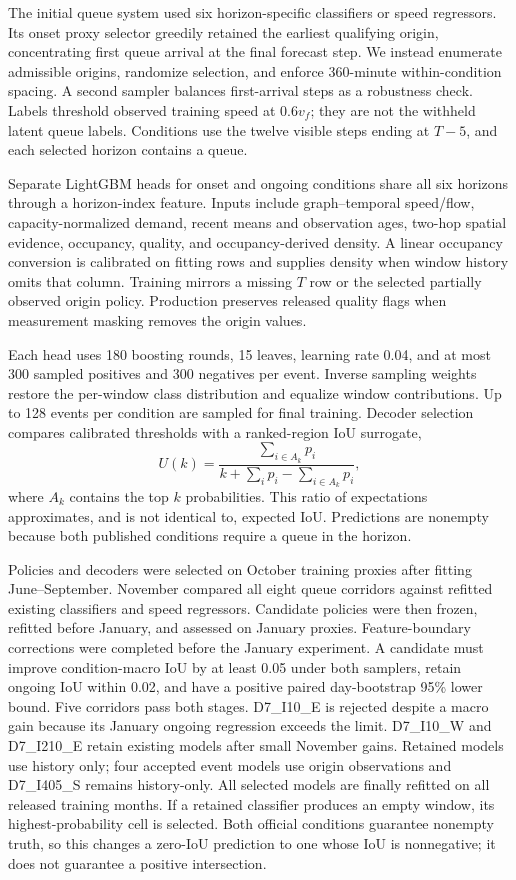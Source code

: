 \documentclass[conference]{IEEEtran}
\begin{document}
The initial queue system used six horizon-specific classifiers or speed
regressors. Its onset proxy selector greedily retained the earliest qualifying
origin, concentrating first queue arrival at the final forecast step. We instead
enumerate admissible origins, randomize selection, and enforce 360-minute
within-condition spacing. A second sampler balances first-arrival steps as a
robustness check. Labels threshold observed training speed at $0.6v_f$;
they are not the withheld latent queue labels. Conditions use the twelve
visible steps ending at $T-5$, and each selected horizon contains a queue.

Separate LightGBM heads for onset and ongoing conditions share all six horizons
through a horizon-index feature. Inputs include graph--temporal speed/flow,
capacity-normalized demand, recent means and observation ages, two-hop spatial
evidence, occupancy, quality, and occupancy-derived density. A linear
occupancy conversion is calibrated on fitting rows and supplies density when
window history omits that column. Training mirrors a missing $T$ row or the
selected partially observed origin policy. Production preserves released quality
flags when measurement masking removes the origin values.

Each head uses 180 boosting rounds, 15 leaves, learning rate 0.04, and at most
300 sampled positives and 300 negatives per event. Inverse sampling weights
restore the per-window class distribution and equalize window contributions.
Up to 128 events per condition are sampled for final training. Decoder selection
compares calibrated thresholds with a ranked-region IoU surrogate,
\begin{equation}
 U(k)=\frac{\sum_{i\in A_k}p_i}{k+\sum_i p_i-\sum_{i\in A_k}p_i},
\end{equation}
where $A_k$ contains the top $k$ probabilities. This ratio of expectations
approximates, and is not identical to, expected IoU. Predictions are nonempty
because both published conditions require a queue in the horizon.

Policies and decoders were selected on October training proxies after fitting
June--September. November compared all eight queue corridors against refitted
existing classifiers and speed regressors. Candidate policies were then frozen,
refitted before January, and assessed on January proxies. Feature-boundary
corrections were completed before the January experiment. A candidate must
improve condition-macro IoU by at least 0.05 under both samplers, retain ongoing
IoU within 0.02, and have a positive paired day-bootstrap 95\% lower bound.
Five corridors pass both stages. D7\_I10\_E is rejected despite a macro gain
because its January ongoing regression exceeds the limit. D7\_I10\_W and
D7\_I210\_E retain existing models after small November gains. Retained models
use history only; four accepted event models use origin observations and
D7\_I405\_S remains history-only. All selected models are finally refitted on
all released training months. If a retained classifier produces an empty window,
its highest-probability cell is selected. Both official conditions guarantee
nonempty truth, so this changes a zero-IoU prediction to one whose IoU is
nonnegative; it does not guarantee a positive intersection.
\end{document}
